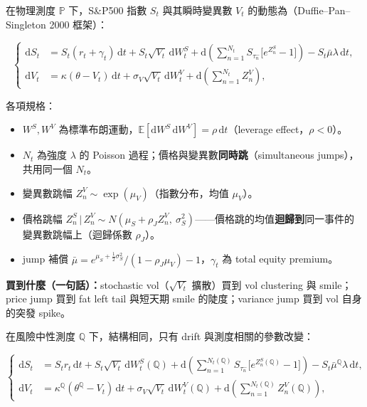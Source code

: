\documentclass[12pt, a4paper]{article}
\theoremstyle{remark}
\newcommand{\E}{\mathbb{E}}
\newcommand{\Q}{\mathbb{Q}}
\newcommand{\Pp}{\mathbb{P}}
\newcommand{\dd}{\mathrm{d}}
\begin{document}
在物理測度 $\Pp$ 下，S\&P500 指數 $S_t$ 與其瞬時變異數 $V_t$ 的動態為（Duffie--Pan--Singleton 2000 框架）：

\begin{equation}
\left\{
\begin{aligned}
  \dd S_t &= S_t(r_t+\gamma_t)\,\dd t + S_t\sqrt{V_t}\,\dd W_t^S
   + \dd\!\left(\sum_{n=1}^{N_t} S_{\tau_n^-}\big[e^{Z_n^S}-1\big]\right) - S_t\bar\mu\lambda\,\dd t,\\
  \dd V_t &= \kappa(\theta-V_t)\,\dd t + \sigma_V\sqrt{V_t}\,\dd W_t^V
   + \dd\!\left(\sum_{n=1}^{N_t} Z_n^V\right),
\end{aligned}
\right.
\tag{3}
\end{equation}

各項規格：
\begin{itemize}[topsep=2pt, itemsep=1pt]
  \item $W^S, W^V$ 為標準布朗運動，$\E[\dd W^S\,\dd W^V]=\rho\,\dd t$（leverage effect，$\rho<0$）。
  \item $N_t$ 為強度 $\lambda$ 的 Poisson 過程；價格與變異數\textbf{同時跳}（simultaneous jumps），共用同一個 $N_t$。
  \item 變異數跳幅 $Z_n^V\sim\exp(\mu_V)$（指數分布，均值 $\mu_V$）。
  \item 價格跳幅 $Z_n^S\,|\,Z_n^V\sim N(\mu_S+\rho_J Z_n^V,\ \sigma_S^2)$——價格跳的均值\textbf{迴歸到}同一事件的變異數跳幅上（迴歸係數 $\rho_J$）。
  \item jump 補償 $\bar\mu = e^{\mu_S+\frac12\sigma_S^2}/(1-\rho_J\mu_V)-1$，$\gamma_t$ 為 total equity premium。
\end{itemize}

\textbf{買到什麼（一句話）：}stochastic vol（$\sqrt{V_t}$ 擴散）買到 vol clustering 與 smile；price jump 買到 fat left tail 與短天期 smile 的陡度；variance jump 買到 vol 自身的突發 spike。

在風險中性測度 $\Q$ 下，結構相同，只有 drift 與測度相關的參數改變：

\begin{equation}
\left\{
\begin{aligned}
  \dd S_t &= S_t r_t\,\dd t + S_t\sqrt{V_t}\,\dd W_t^{S}(\Q)
   + \dd\!\left(\sum_{n=1}^{N_t(\Q)} S_{\tau_n^-}\big[e^{Z_n^S(\Q)}-1\big]\right) - S_t\bar\mu^\Q\lambda\,\dd t,\\
  \dd V_t &= \kappa^\Q(\theta^\Q-V_t)\,\dd t + \sigma_V\sqrt{V_t}\,\dd W_t^{V}(\Q)
   + \dd\!\left(\sum_{n=1}^{N_t(\Q)} Z_n^V(\Q)\right),
\end{aligned}
\right.
\tag{4}
\end{equation}
\end{document}
